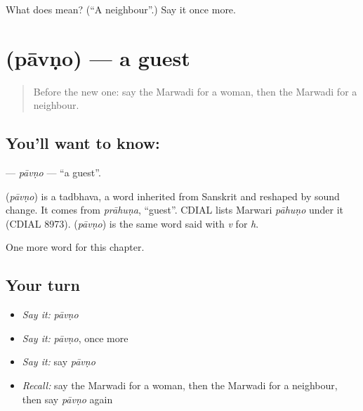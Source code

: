 \begin{tcolorbox}[breakable,colback=teal!4,colframe=teal!35!black,title={Before you move on}]
What does  mean? (\textquotedblleft{}A neighbour\textquotedblright{}.) Say it once more.
\end{tcolorbox}
\section[\texorpdfstring{\mw{पावणो} (pāvṇo)}{पावणो (pāvṇo)}]{ (pāvṇo) — a guest}

\label{lesson:MW-C50-pavno}



\begin{quote}
Before the new one: say the Marwadi for a woman, then the Marwadi for a neighbour.
\end{quote}

\subsection*{You'll want to know: }
\textbf{} — \emph{pāvṇo} — \textquotedblleft{}a guest\textquotedblright{}.

\begin{cousinweb}
\textbf{} (\emph{pāvṇo}) is a tadbhava, a word inherited from Sanskrit and reshaped by sound change. It comes from \emph{prāhuṇa}, \textquotedblleft{}guest\textquotedblright{}. CDIAL lists Marwari \emph{pāhuṇo} under it (CDIAL 8973). \textbf{} (\emph{pāvṇo}) is the same word said with \emph{v} for \emph{h}.
\end{cousinweb}

\begin{grammarlens}[title={What you've built}]
One more word for this chapter.
\end{grammarlens}

\subsection*{Your turn}
\begin{itemize}
\raggedright
  \item \emph{Say it:} \emph{pāvṇo}
  \item \emph{Say it:} \emph{pāvṇo}, once more
  \item \emph{Say it:} say \emph{pāvṇo}
  \item \emph{Recall:} say the Marwadi for a woman, then the Marwadi for a neighbour, then say \emph{pāvṇo} again
\end{itemize}

